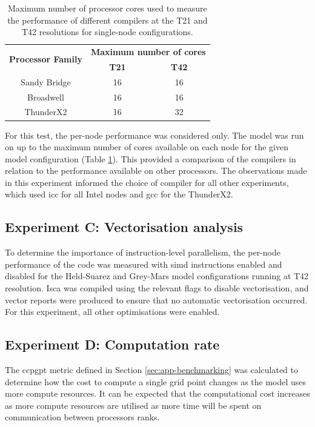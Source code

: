 \documentclass[a4paper,11pt]{report}
\begin{document}
\begin{table}[htp]
\caption[Number of processor cores used to measure the performance of different compilers]{Maximum number of processor cores used to measure the performance of different compilers at the T21 and T42 resolutions for single-node configurations.}
\begin{center}
\begin{tabular}{c c c}
\toprule
\multirow{2}{*}{\textbf{Processor Family}}	&	\multicolumn{2}{c}{\textbf{Maximum number of cores}}	\\
							 		\cmidrule(lr){2-3}
								& 	\textbf{T21} 	&	\textbf{T42}			\\
\midrule
Sandy Bridge						&	16			&	16					\\
Broadwell							&	16			&	16					\\
ThunderX2						&	16			&	32					\\
\bottomrule
\end{tabular}
\end{center}
\label{tbl:-compiler-cores}
\end{table}%

\par

For this test, the per-node performance was considered only. The model was run on up to the maximum number of cores available on each node for the given model configuration (Table \ref{tbl:-compiler-cores}). This provided a comparison of the compilers in relation to the performance available on other processors. The observations made in this experiment informed the choice of compiler for all other experiments, which used \gls{icc} for all Intel nodes and \gls{gcc} for the ThunderX2.

\subsection{Experiment C: Vectorisation analysis}
To determine the importance of instruction-level parallelism, the per-node performance of the code was measured with \gls{simd} instructions enabled and disabled for the Held-Suarez and Grey-Mars model configurations running at T42 resolution. Isca was compiled using the relevant flags to disable vectorisation, and vector reports were produced to ensure that no automatic vectorisation occurred. For this experiment, all other optimisations were enabled.

\subsection{Experiment D: Computation rate}
The \gls{ccpgpt} metric defined in Section \ref{sec:app-benchmarking} was calculated to determine how the cost to compute a single grid point changes as the model uses more compute resources. It can be expected that the computational cost increases as more compute resources are utilised as more time will be spent on communication between processors ranks. 
\end{document}
